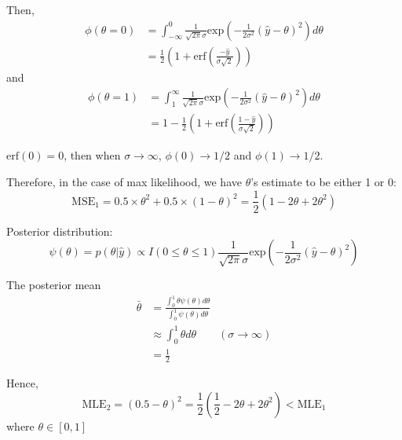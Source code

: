 \documentclass{article}
\begin{document}
\begin{itemize}

Then, 
\begin{align*}
\phi (\theta = 0) &= \int_{-\infty}^0\frac{1}{\sqrt{2 \pi} \sigma} \text{exp} \left(-\frac{1}{2\sigma^2} (\hat y - \theta)^2 \right) d\theta \\
&= \frac{1}{2} \left (1 + \text{erf} \left( \frac{-\hat y}{\sigma \sqrt 2}\right) \right)
\end{align*}
and 
\begin{align*}
\phi (\theta = 1) &= \int_1^{\infty}\frac{1}{\sqrt{2 \pi} \sigma} \text{exp} \left(-\frac{1}{2\sigma^2} (\hat y - \theta)^2 \right) d\theta \\
&= 1 - \frac{1}{2} \left (1 + \text{erf} \left( \frac{1 -\hat y}{\sigma \sqrt 2}\right) \right)
\end{align*}

$\text{erf}(0) = 0$, then when $\sigma \rightarrow \infty$, $\phi(0) \rightarrow 1/2$ and $\phi(1) \rightarrow 1/2$.

Therefore, in the case of max likelihood, we have $\theta$'s estimate to be either 1 or 0: 
$$
\text{MSE}_1 = 0.5 \times \theta^2 + 0.5 \times (1 - \theta)^2 = \frac{1}{2}(1 - 2 \theta + 2 \theta^2)
$$

Posterior distribution:
$$
\psi(\theta) = p(\theta| \hat y) \propto I(0\leq \theta \leq 1) \frac{1}{\sqrt{2 \pi} \sigma} \text{exp} \left(-\frac{1}{2\sigma^2} (\hat y - \theta)^2 \right)
$$

The posterior mean 
\begin{align*}
  \bar \theta &= \frac{\int_0^1 \theta \psi(\theta) d\theta}{\int_0^1 \psi(\theta) d\theta} \\
   &\approx \int_0^1 \theta d\theta \quad \quad (\sigma \rightarrow \infty) \\ &= \frac{1}{2}
\end{align*}

Hence, 
$$\text{MLE}_2 = (0.5 - \theta)^2 = \frac{1}{2}\left( \frac{1}{2} - 2 \theta + 2 \theta^2 \right) < \text{MLE}_1
$$
where $\theta \in [0,1]$


\end{itemize}
\end{document}
